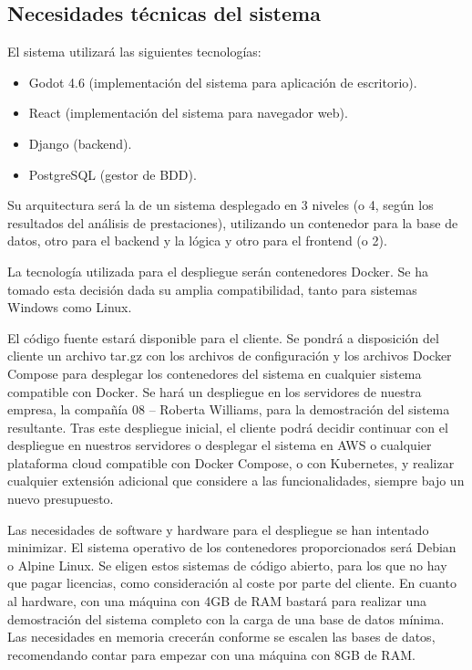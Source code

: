 \documentclass[11pt]{article}
\begin{document}
\subsection{Necesidades técnicas del sistema}
El sistema utilizará las siguientes tecnologías:
\begin{itemize}
		\item Godot 4.6 (implementación del sistema para aplicación de escritorio).
		\item React (implementación del sistema para navegador web).
		\item Django (backend).
		\item PostgreSQL (gestor de BDD).
\end{itemize}
Su arquitectura será la de un sistema desplegado en 3 niveles (o 4, según los 
resultados del análisis de prestaciones), utilizando un contenedor para la
base de datos, otro para el backend y la lógica y otro para el frontend (o 2).

La tecnología utilizada para el despliegue serán contenedores Docker.
Se ha tomado esta decisión dada su amplia compatibilidad, tanto para sistemas
Windows como Linux.

El código fuente estará disponible para el cliente. 
Se pondrá a disposición del cliente un archivo tar.gz con los archivos de
configuración y los archivos Docker Compose para desplegar los contenedores del sistema
en cualquier sistema compatible con Docker. 
Se hará un despliegue en los servidores de nuestra empresa, la compañía 
08 -- Roberta Williams, para la demostración del sistema resultante.
Tras este despliegue inicial, el cliente
podrá decidir continuar con el despliegue en nuestros servidores o
desplegar el sistema en AWS o cualquier plataforma cloud compatible con 
Docker Compose, o con Kubernetes, 
y realizar cualquier extensión adicional que considere a las funcionalidades,
siempre bajo un nuevo presupuesto.

Las necesidades de software y hardware para el despliegue se han intentado
minimizar.
El sistema operativo de los contenedores proporcionados
será Debian o Alpine Linux. Se eligen estos sistemas de código abierto, 
para los que no hay que pagar licencias, como consideración al coste por 
parte del cliente. 
En cuanto al hardware, con una máquina con 4GB de RAM bastará para realizar
una demostración del sistema completo con la carga de una base de datos
mínima. Las necesidades en memoria crecerán conforme se escalen las bases de
datos, recomendando contar para empezar con una máquina con 8GB de RAM.
\end{document}
